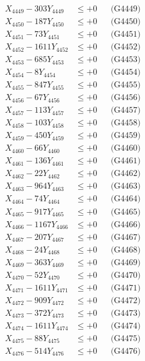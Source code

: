 \documentclass[a4paper,10pt]{article}
\begin{document}
{\begin{align}
X_{4449} - 303Y_{4449} &\leq +0 && \text{(G4449)} \\
X_{4450} - 187Y_{4450} &\leq +0 && \text{(G4450)} \\
\allowbreak
X_{4451} - 73Y_{4451} &\leq +0 && \text{(G4451)} \\
X_{4452} - 1611Y_{4452} &\leq +0 && \text{(G4452)} \\
X_{4453} - 685Y_{4453} &\leq +0 && \text{(G4453)} \\
X_{4454} - 8Y_{4454} &\leq +0 && \text{(G4454)} \\
X_{4455} - 847Y_{4455} &\leq +0 && \text{(G4455)} \\
X_{4456} - 67Y_{4456} &\leq +0 && \text{(G4456)} \\
X_{4457} - 113Y_{4457} &\leq +0 && \text{(G4457)} \\
X_{4458} - 103Y_{4458} &\leq +0 && \text{(G4458)} \\
X_{4459} - 450Y_{4459} &\leq +0 && \text{(G4459)} \\
X_{4460} - 66Y_{4460} &\leq +0 && \text{(G4460)} \\
\allowbreak
X_{4461} - 136Y_{4461} &\leq +0 && \text{(G4461)} \\
X_{4462} - 22Y_{4462} &\leq +0 && \text{(G4462)} \\
X_{4463} - 964Y_{4463} &\leq +0 && \text{(G4463)} \\
X_{4464} - 74Y_{4464} &\leq +0 && \text{(G4464)} \\
X_{4465} - 917Y_{4465} &\leq +0 && \text{(G4465)} \\
X_{4466} - 1167Y_{4466} &\leq +0 && \text{(G4466)} \\
X_{4467} - 207Y_{4467} &\leq +0 && \text{(G4467)} \\
X_{4468} - 24Y_{4468} &\leq +0 && \text{(G4468)} \\
X_{4469} - 363Y_{4469} &\leq +0 && \text{(G4469)} \\
X_{4470} - 52Y_{4470} &\leq +0 && \text{(G4470)} \\
\allowbreak
X_{4471} - 1611Y_{4471} &\leq +0 && \text{(G4471)} \\
X_{4472} - 909Y_{4472} &\leq +0 && \text{(G4472)} \\
X_{4473} - 372Y_{4473} &\leq +0 && \text{(G4473)} \\
X_{4474} - 1611Y_{4474} &\leq +0 && \text{(G4474)} \\
X_{4475} - 88Y_{4475} &\leq +0 && \text{(G4475)} \\
X_{4476} - 514Y_{4476} &\leq +0 && \text{(G4476)} \\

\end{align}}
\end{document}
